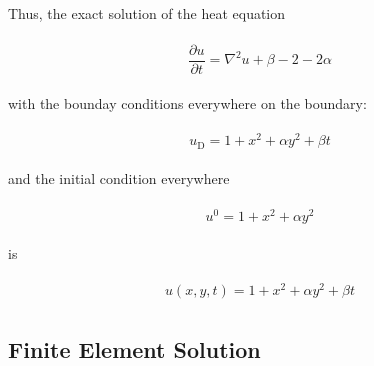 \documentclass{article}
\newcommand{\PDfirst}[2]{ \dfrac{\partial #1}{\partial #2}  }
\begin{document}
	Thus, the exact solution of the heat equation 
	
	\begin{gather}
	\begin{split}
	\PDfirst{u}{t} = \nabla^2u + \beta - 2 - 2\alpha
	\end{split}
	\end{gather}
	
	with the bounday conditions everywhere on the boundary:
	
	\begin{gather}
	\begin{split}
		u_\mathrm{D} = 1 + x^2+\alpha y^2 + \beta t
	\end{split}
	\end{gather}
	
	and the initial condition everywhere
	
	\begin{gather}
	\begin{split}
		u^0= 1 + x^2+\alpha y^2 
	\end{split}
	\end{gather}
	
	is
	
	\begin{gather}
	\begin{split}
		u(x,y,t) =  1 + x^2+\alpha y^2 + \beta t
	\end{split}
	\end{gather}
	
	
	
	\subsection*{Finite Element Solution}
	
	
	
	
	
\end{document}
